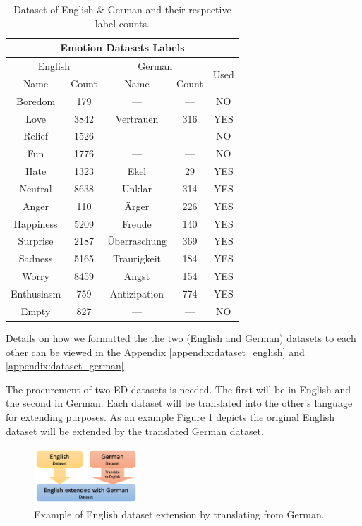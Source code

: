 \documentclass[11pt]{article}
\begin{document}
\begin{table}[h!]
\centering
\begin{tabular}{ | c c | c c | c | }
    \hline
    \multicolumn{5}{|c|}{Emotion Datasets Labels} \\
    
    \hline
    \multicolumn{2}{|c|}{English} & \multicolumn{2}{|c|}{German} & \multirow{2}{*}{Used} \\
    Name & Count & Name & Count \\
    \hline
    Boredom    &  179 & ---           & --- & NO  \\
    Love       & 3842 & Vertrauen     & 316 & YES \\
    Relief     & 1526 & ---           & --- & NO  \\ 
    Fun        & 1776 & ---           & --- & NO  \\
    Hate       & 1323 & Ekel          &  29 & YES \\
    Neutral    & 8638 & Unklar        & 314 & YES \\
    Anger      &  110 & Ärger         & 226 & YES \\
    Happiness  & 5209 & Freude        & 140 & YES \\
    Surprise   & 2187 & Überraschung  & 369 & YES \\
    Sadness    & 5165 & Traurigkeit   & 184 & YES \\
    Worry      & 8459 & Angst         & 154 & YES \\
    Enthusiasm &  759 & Antizipation  & 774 & YES \\
    Empty      &  827 & ---           & --- & NO  \\
    \hline
\end{tabular}
\caption{Dataset of English \& German and their respective label counts.}
\label{table:dataset_labels}
\end{table}

Details on how we formatted the the two (English and German) datasets to each other can be viewed in the Appendix \ref{appendix:dataset_english} and \ref{appendix:dataset_german}

The procurement of two ED datasets is needed. The first will be in English and the second in German. Each dataset will be translated into the other’s language for extending purposes. As an example Figure \ref{fig:dataset-extension} depicts the original English dataset will be extended by the translated German dataset.

\begin{figure}[h]
    \centering
    \includegraphics[width=0.35\textwidth]{Dataset-Extension}
    \caption{Example of English dataset extension by translating from German.}
    \label{fig:dataset-extension}
\end{figure}
\end{document}
